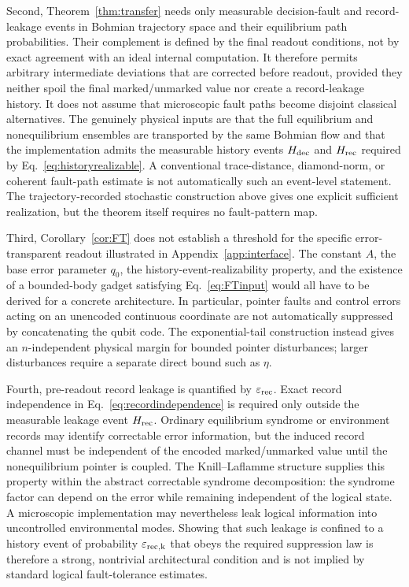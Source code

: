 \documentclass[pdflatex,sn-mathphys-num]{sn-jnl}
\theoremstyle{thmstyleone}
\begin{document}
Second, Theorem~\ref{thm:transfer} needs only measurable decision-fault and record-leakage events in Bohmian trajectory space and their equilibrium path probabilities. Their complement is defined by the final readout conditions, not by exact agreement with an ideal internal computation. It therefore permits arbitrary intermediate deviations that are corrected before readout, provided they neither spoil the final marked/unmarked value nor create a record-leakage history. It does not assume that microscopic fault paths become disjoint classical alternatives. The genuinely physical inputs are that the full equilibrium and nonequilibrium ensembles are transported by the same Bohmian flow and that the implementation admits the measurable history events $H_{\rm dec}$ and $H_{\rm rec}$ required by Eq.~\eqref{eq:historyrealizable}. A conventional trace-distance, diamond-norm, or coherent fault-path estimate is not automatically such an event-level statement. The trajectory-recorded stochastic construction above gives one explicit sufficient realization, but the theorem itself requires no fault-pattern map.

Third, Corollary~\ref{cor:FT} does not establish a threshold for the specific error-transparent readout illustrated in Appendix~\ref{app:interface}. The constant $A$, the base error parameter $q_0$, the history-event-realizability property, and the existence of a bounded-body gadget satisfying Eq.~\eqref{eq:FTinput} would all have to be derived for a concrete architecture. In particular, pointer faults and control errors acting on an unencoded continuous coordinate are not automatically suppressed by concatenating the qubit code. The exponential-tail construction instead gives an $n$-independent physical margin for bounded pointer disturbances; larger disturbances require a separate direct bound such as $\eta$.

Fourth, pre-readout record leakage is quantified by $\varepsilon_{\rm rec}$. Exact record independence in Eq.~\eqref{eq:recordindependence} is required only outside the measurable leakage event $H_{\rm rec}$. Ordinary equilibrium syndrome or environment records may identify correctable error information, but the induced record channel must be independent of the encoded marked/unmarked value until the nonequilibrium pointer is coupled. The Knill--Laflamme structure supplies this property within the abstract correctable syndrome decomposition: the syndrome factor can depend on the error while remaining independent of the logical state. A microscopic implementation may nevertheless leak logical information into uncontrolled environmental modes. Showing that such leakage is confined to a history event of probability $\varepsilon_{\rm rec,k}$ that obeys the required suppression law is therefore a strong, nontrivial architectural condition and is not implied by standard logical fault-tolerance estimates.
\end{document}
